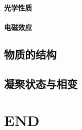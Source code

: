 \documentclass[UTF8]{../06-Physics}
\begin{document}
        \subsubsection{光学性质}
        \subsubsection{电磁效应}
\section{物质的结构}
\section{凝聚状态与相变}






\chapter{END}
\end{document}
